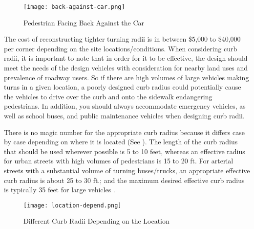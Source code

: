 \begin{figure}
\centering
	\texttt{[image: back-against-car.png]}
	\caption{Pedestrian Facing Back Against the Car}\label{fig:back-against-car}
\end{figure}

The cost of reconstructing tighter turning radii is in between \$5,000 to \$40,000 per corner depending on the site locations/conditions. When considering curb radii, it is important to note that in order for it to be effective, the design should meet the needs of the design vehicles with consideration for nearby land uses and prevalence of roadway users. So if there are high volumes of large vehicles making turns in a given location, a poorly designed curb radius could potentially cause the vehicles to drive over the curb and onto the sidewalk endangering pedestrians. In addition, you should always accommodate emergency vehicles, as well as school buses, and public maintenance vehicles when designing curb radii\cite{walking-info-curb}.


There is no magic number for the appropriate curb radius because it differs case by case depending on where it is located (See ). The length of the curb radius that should be used wherever possible is 5 to 10 feet, whereas an effective radius for urban streets with high volumes of pedestrians is 15 to 20 ft. For arterial streets with a substantial volume of turning buses/trucks, an appropriate effective curb radius is about 25 to 30 ft.; and the maximum desired effective curb radius is typically 35 feet for large vehicles \cite{walking-info-curb}.

\begin{figure}
\centering
	\texttt{[image: location-depend.png]}
	\caption{Different Curb Radii Depending on the Location}\label{fig:location-depend}
\end{figure}
